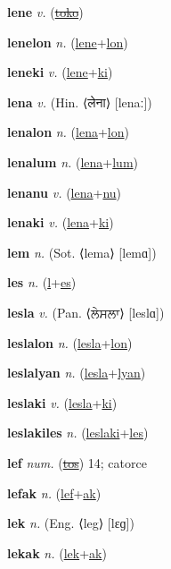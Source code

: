 \textbf{\hypertarget{lene}{lene}} \textit{v.} (\hyperlink{toko}{\sout{toko}})


\textbf{\hypertarget{lenelon}{lenelon}} \textit{n.} (\hyperlink{lene}{lene}+\allowbreak \hyperlink{lon}{lon})


\textbf{\hypertarget{leneki}{leneki}} \textit{v.} (\hyperlink{lene}{lene}+\allowbreak \hyperlink{ki}{ki})


\textbf{\hypertarget{lena}{lena}} \textit{v.} (Hin. ⟨{\devanagari{}लेना}⟩ [lenaː])


\textbf{\hypertarget{lenalon}{lenalon}} \textit{n.} (\hyperlink{lena}{lena}+\allowbreak \hyperlink{lon}{lon})


\textbf{\hypertarget{lenalum}{lenalum}} \textit{n.} (\hyperlink{lena}{lena}+\allowbreak \hyperlink{lum}{lum})


\textbf{\hypertarget{lenanu}{lenanu}} \textit{v.} (\hyperlink{lena}{lena}+\allowbreak \hyperlink{nu}{nu})


\textbf{\hypertarget{lenaki}{lenaki}} \textit{v.} (\hyperlink{lena}{lena}+\allowbreak \hyperlink{ki}{ki})


\textbf{\hypertarget{lem}{lem}} \textit{n.} (Sot. ⟨lema⟩ [lemɑ])


\textbf{\hypertarget{les}{les}} \textit{n.} (\hyperlink{l}{l}+\allowbreak \hyperlink{es}{es})


\textbf{\hypertarget{lesla}{lesla}} \textit{v.} (Pan. ⟨{\gurmukhi{}ਲੇਸਲਾ}⟩ [leslɑ])


\textbf{\hypertarget{leslalon}{leslalon}} \textit{n.} (\hyperlink{lesla}{lesla}+\allowbreak \hyperlink{lon}{lon})


\textbf{\hypertarget{leslalyan}{leslalyan}} \textit{n.} (\hyperlink{lesla}{lesla}+\allowbreak \hyperlink{lyan}{lyan})


\textbf{\hypertarget{leslaki}{leslaki}} \textit{v.} (\hyperlink{lesla}{lesla}+\allowbreak \hyperlink{ki}{ki})


\textbf{\hypertarget{leslakiles}{leslakiles}} \textit{n.} (\hyperlink{leslaki}{leslaki}+\allowbreak \hyperlink{les}{les})


\textbf{\hypertarget{lef}{lef}} \textit{num.} (\hyperlink{tos}{\sout{tos}})
14; catorce

\textbf{\hypertarget{lefak}{lefak}} \textit{n.} (\hyperlink{lef}{lef}+\allowbreak \hyperlink{ak}{ak})


\textbf{\hypertarget{lek}{lek}} \textit{n.} (Eng. ⟨leg⟩ [lɛɡ])


\textbf{\hypertarget{lekak}{lekak}} \textit{n.} (\hyperlink{lek}{lek}+\allowbreak \hyperlink{ak}{ak})


